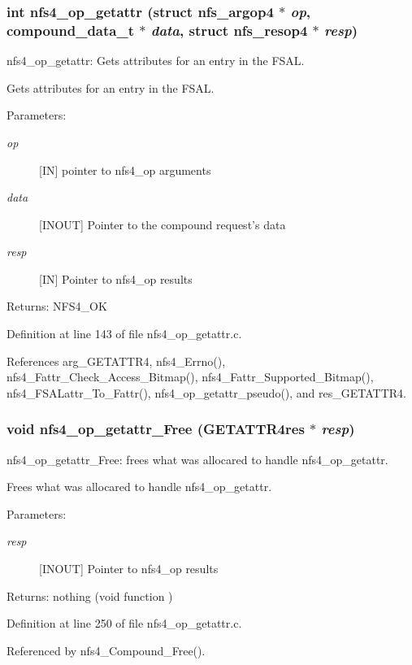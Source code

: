 \subsubsection{\setlength{\rightskip}{0pt plus 5cm}int nfs4\_\-op\_\-getattr (struct nfs\_\-argop4 $\ast$ {\em op}, compound\_\-data\_\-t $\ast$ {\em data}, struct nfs\_\-resop4 $\ast$ {\em resp})}\label{nfs4__op__getattr_8c_a3}


nfs4\_\-op\_\-getattr: Gets attributes for an entry in the FSAL.

Gets attributes for an entry in the FSAL.

\begin{Desc}
\item[Parameters:]
\begin{description}
\item[{\em op}][IN] pointer to nfs4\_\-op arguments \item[{\em data}][INOUT] Pointer to the compound request's data \item[{\em resp}][IN] Pointer to nfs4\_\-op results\end{description}
\end{Desc}
\begin{Desc}
\item[Returns:]NFS4\_\-OK \end{Desc}


Definition at line 143 of file nfs4\_\-op\_\-getattr.c.

References arg\_\-GETATTR4, nfs4\_\-Errno(), nfs4\_\-Fattr\_\-Check\_\-Access\_\-Bitmap(), nfs4\_\-Fattr\_\-Supported\_\-Bitmap(), nfs4\_\-FSALattr\_\-To\_\-Fattr(), nfs4\_\-op\_\-getattr\_\-pseudo(), and res\_\-GETATTR4.
\subsubsection{\setlength{\rightskip}{0pt plus 5cm}void nfs4\_\-op\_\-getattr\_\-Free (GETATTR4res $\ast$ {\em resp})}\label{nfs4__op__getattr_8c_a4}


nfs4\_\-op\_\-getattr\_\-Free: frees what was allocared to handle nfs4\_\-op\_\-getattr.

Frees what was allocared to handle nfs4\_\-op\_\-getattr.

\begin{Desc}
\item[Parameters:]
\begin{description}
\item[{\em resp}][INOUT] Pointer to nfs4\_\-op results\end{description}
\end{Desc}
\begin{Desc}
\item[Returns:]nothing (void function ) \end{Desc}


Definition at line 250 of file nfs4\_\-op\_\-getattr.c.

Referenced by nfs4\_\-Compound\_\-Free().